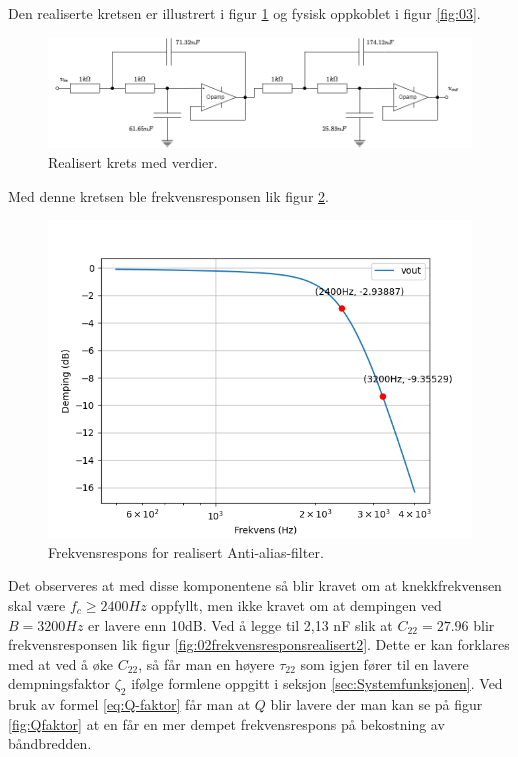Den realiserte kretsen er illustrert i figur \ref{fig:01realised} og fysisk oppkoblet i figur \ref{fig:03}. 

\begin{figure}[!h]
	\centering
	\includegraphics[scale=0.45]{./Images/03Research/01realisertkrets.png}
	\caption{Realisert krets med verdier.\cite{pham_2022_selvlaget}}
	\label{fig:01realised}
\end{figure}

Med denne kretsen ble frekvensresponsen lik figur \ref{fig:02frekvensresponsrealisert}.

\begin{figure}[!h]
	\centering
	\includegraphics[scale=0.45]{./Images/03Research/02frekvensrespons.png}
	\caption{Frekvensrespons for realisert Anti-alias-filter.}
	\label{fig:02frekvensresponsrealisert}
\end{figure}

Det observeres at med disse komponentene så blir kravet om at knekkfrekvensen skal være $f_c\geq2400Hz$ oppfyllt, men ikke kravet om at dempingen ved $B=3200Hz$ er lavere enn 10dB. Ved å legge til 2,13 nF slik at $C_{22} = 27.96$ blir frekvensresponsen lik figur \ref{fig:02frekvensresponsrealisert2}. Dette er kan forklares med at ved å øke $C_{22}$, så får man en høyere $\tau_{22}$ som igjen fører til en lavere dempningsfaktor $\zeta_2$ ifølge formlene oppgitt i seksjon \ref{sec:Systemfunksjonen}. Ved bruk av formel \ref{eq:Q-faktor}  får man at $Q$ blir lavere der man kan se på figur \ref{fig:Qfaktor} at en får en mer dempet frekvensrespons på bekostning av båndbredden.

